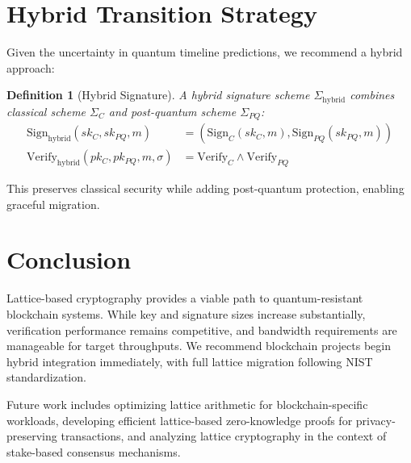 \documentclass[11pt,a4paper]{article}
\newtheorem{definition}[theorem]{Definition}
\begin{document}
\section{Hybrid Transition Strategy}

Given the uncertainty in quantum timeline predictions, we recommend a hybrid approach:

\begin{definition}[Hybrid Signature]
A hybrid signature scheme $\Sigma_{\text{hybrid}}$ combines classical scheme $\Sigma_C$ and post-quantum scheme $\Sigma_{PQ}$:
\begin{align}
\text{Sign}_{\text{hybrid}}(sk_C, sk_{PQ}, m) &= (\text{Sign}_C(sk_C, m), \text{Sign}_{PQ}(sk_{PQ}, m)) \\
\text{Verify}_{\text{hybrid}}(pk_C, pk_{PQ}, m, \sigma) &= \text{Verify}_C \land \text{Verify}_{PQ}
\end{align}
\end{definition}

This preserves classical security while adding post-quantum protection, enabling graceful migration.

\section{Conclusion}

Lattice-based cryptography provides a viable path to quantum-resistant blockchain systems. While key and signature sizes increase substantially, verification performance remains competitive, and bandwidth requirements are manageable for target throughputs. We recommend blockchain projects begin hybrid integration immediately, with full lattice migration following NIST standardization.

Future work includes optimizing lattice arithmetic for blockchain-specific workloads, developing efficient lattice-based zero-knowledge proofs for privacy-preserving transactions, and analyzing lattice cryptography in the context of stake-based consensus mechanisms.
\end{document}

